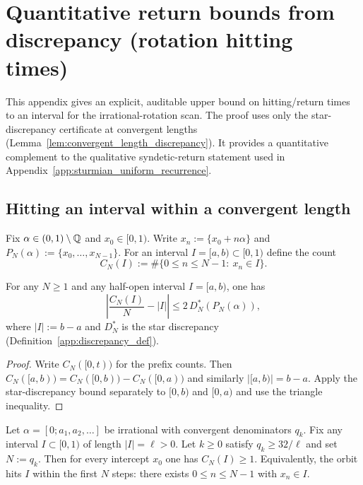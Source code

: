 \section{Quantitative return bounds from discrepancy (rotation hitting times)}
\label{app:rotation_hitting_time_discrepancy}
\noindent
This appendix gives an explicit, auditable upper bound on hitting/return times to an interval for the irrational-rotation scan.
The proof uses only the star-discrepancy certificate at convergent lengths (Lemma~\ref{lem:convergent_length_discrepancy}).
It provides a quantitative complement to the qualitative syndetic-return statement used in Appendix~\ref{app:sturmian_uniform_recurrence}.

\subsection{Hitting an interval within a convergent length}
\label{subsec:hitting_time_convergent_length}

\begin{definition}\label{def:rotation_orbit_interval_counts}
\MathTag Fix $\alpha\in(0,1)\setminus\mathbb{Q}$ and $x_0\in[0,1)$.
Write $x_n:=\{x_0+n\alpha\}$ and $P_N(\alpha):=\{x_0,\ldots,x_{N-1}\}$.
For an interval $I=[a,b)\subset[0,1)$ define the count
\[
C_N(I):=\#\{0\le n\le N-1:\ x_n\in I\}.
\]
\end{definition}

\begin{lemma}\label{lem:discrepancy_controls_interval_counts}
\MathTag For any $N\ge 1$ and any half-open interval $I=[a,b)$, one has
\[
\left|\frac{C_N(I)}{N}-|I|\right|\le 2\,D_N^\ast(P_N(\alpha)),
\]
where $|I|:=b-a$ and $D_N^\ast$ is the star discrepancy (Definition~\ref{app:discrepancy_def}).
\end{lemma}

\begin{proof}
Write $C_N([0,t))$ for the prefix counts.
Then $C_N([a,b))=C_N([0,b))-C_N([0,a))$ and similarly $|[a,b)|=b-a$.
Apply the star-discrepancy bound separately to $[0,b)$ and $[0,a)$ and use the triangle inequality.
\end{proof}

\begin{theorem}\label{thm:rotation_interval_hitting_convergent}
\MathTag Let $\alpha=[0;a_1,a_2,\ldots]$ be irrational with convergent denominators $q_k$.
Fix any interval $I\subset[0,1)$ of length $|I|=\ell>0$.
Let $k\ge 0$ satisfy $q_k\ge 32/\ell$ and set $N:=q_k$.
Then for every intercept $x_0$ one has $C_N(I)\ge 1$.
Equivalently, the orbit hits $I$ within the first $N$ steps:
there exists $0\le n\le N-1$ with $x_n\in I$.
\end{theorem}

